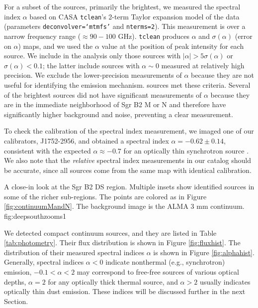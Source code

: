 \documentclass[twocolumn]{aastex61}
\begin{document}

For a subset of the sources, primarily the brightest, we measured the spectral
index $\alpha$ based on CASA \texttt{tclean}'s  2-term Taylor expansion model
of the data (parameters \texttt{deconvolver=`mtmfs'} and \texttt{nterms=2}).
This measurement is over a narrow frequency range ($\approx90-100$ GHz).
\texttt{tclean} produces $\alpha$ and $\sigma(\alpha)$ (error on $\alpha$)
maps, and we used the $\alpha$ value at the position of peak intensity for each
source.  We include in the analysis only those sources with $|\alpha| > 5
\sigma(\alpha)$ or $\sigma(\alpha) < 0.1$; the latter include sources with
$\alpha\sim0$ measured at relatively high precision.  We exclude the lower-precision
measurements of $\alpha$ because they are not useful for identifying the emission
mechanism.  \nalphas sources met these
criteria. Several of the brightest sources did not have significant
measurements of $\alpha$ because they are in the immediate neighborhood of Sgr
B2 M or N and therefore have significantly higher background and noise,
preventing a clear measurement.

To check the calibration of the spectral index measurement, we imaged one of
our calibrators, J1752-2956, and obtained a spectral index
$\alpha=-0.62\pm0.14$, consistent with the expected $\alpha\approx-0.7$ for an
optically thin synchrotron source \citep[e.g.,][]{Condon2007a}.  We also note
that the \emph{relative} spectral index measurements in our catalog should be
accurate, since all sources come from the same map with identical calibration.

{A close-in look at the Sgr B2 DS region.  Multiple insets show identified sources
in some of the richer sub-regions.  The points are colored as in Figure
\ref{fig:continuumMandN}.  The background image is the ALMA 3 mm continuum.}
{fig:deepsouthzooms}{1}{\textwidth}

We detected \ncores compact continuum sources, and they are listed
in Table \ref{tab:photometry}.  Their flux distribution is
shown in Figure \ref{fig:fluxhist}.  The distribution of their measured
spectral indices $\alpha$ is shown in Figure \ref{fig:alphahist}.
Generally, spectral indices $\alpha<0$ indicate nonthermal (e.g., synchrotron)
emission, $-0.1<\alpha<2$ may correspond to free-free sources of various
optical depths, $\alpha=2$ for any optically thick thermal source,
and $\alpha>2$ usually indicates optically thin dust emission.  These indices
will be discussed further in the next Section.
\end{document}
